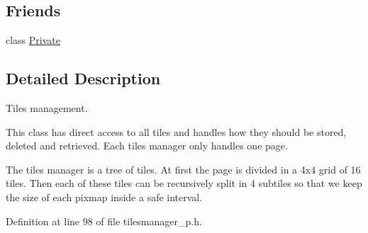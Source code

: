 \subsection*{Friends}
\begin{DoxyCompactItemize}
\item 
class \hyperlink{classOkular_1_1TilesManager_ac96b60d37bd806132da680e187dc2288}{Private}
\end{DoxyCompactItemize}


\subsection{Detailed Description}
Tiles management. 

This class has direct access to all tiles and handles how they should be stored, deleted and retrieved. Each tiles manager only handles one page.

The tiles manager is a tree of tiles. At first the page is divided in a 4x4 grid of 16 tiles. Then each of these tiles can be recursively split in 4 subtiles so that we keep the size of each pixmap inside a safe interval. 

Definition at line 98 of file tilesmanager\+\_\+p.\+h.



